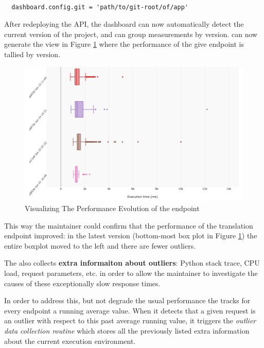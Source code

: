 \documentclass[conference]{IEEEtran}
\begin{document}
  \begin{lstlisting}[caption=Configuring the \tool with the path to the .git folder enables the generation of evolutionary performance graphs, style=custompython]

  dashboard.config.git = 'path/to/git-root/of/app'

  \end{lstlisting}

  After redeploying the API, the dashboard can now automatically detect the current version of the project, and can group measurements by version. \tool can now generate the view in Figure \ref{fig:tee} where the performance of the give endpoint is tallied by version.

  \begin{figure}[!ht]
    \centering
    \includegraphics[width=\linewidth]{translation_endpoint_evolution.png}
    \caption{Visualizing The Performance Evolution of the \epTranslations endpoint}
    \label{fig:tee}
  \end{figure}

  This way the maintainer could confirm that the performance of the translation endpoint improved: in the latest version (bottom-most box plot in Figure \ref{fig:tee}) the entire boxplot moved to the left and there are fewer outliers.


  \niceseparator

  The \tool also collects {\bf extra informaiton about outliers}: Python stack trace, CPU load, request parameters, etc. in order to allow the maintainer to investigate the causes of these exceptionally slow response times. 

  In order to address this, but not degrade the usual performance the \tool tracks for every endpoint a running average value. When it detects that a given request is an outlier with respect to this past average running value, it triggers the {\em outlier data collection routine} which stores all the previously listed extra information about the current execution environment. 
\end{document}
